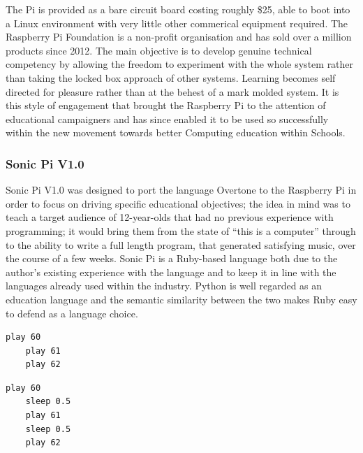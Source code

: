 \documentclass[11pt, abstracton, twoside]{scrartcl}
\begin{document}
The Pi is provided as a bare circuit board costing roughly \$25, able to boot 
into a Linux environment with very little other commerical equipment required. 
The Raspberry Pi Foundation is a non-profit organisation and has sold over a 
million products since 2012. The main objective is to develop genuine 
technical competency by allowing the freedom to experiment with the whole 
system rather than taking the locked box approach of other systems. Learning 
becomes self directed for pleasure rather than at the behest of a mark molded 
system. It is this style of engagement that brought the Raspberry Pi to the 
attention of educational campaigners and has since enabled it to be used so 
successfully within the new movement towards better Computing education within 
Schools. 

\subsubsection{Sonic Pi V1.0}

\begin{multicols}{2}
Sonic Pi V1.0 was designed to port the language Overtone to the Raspberry Pi in 
order to focus on driving specific educational objectives; the idea in mind was 
to teach a target audience of 12-year-olds that had no previous experience with 
programming; it would bring them from the state of ``this is a computer'' through 
to the ability to write a full length program, that generated satisfying music, 
over the course of a few weeks. Sonic Pi is a Ruby-based language both due to 
the author's existing experience with the language and to keep it in line with 
the languages already used within the industry. Python is well regarded as an 
education language and the semantic similarity between the two makes Ruby easy 
to defend as a language choice.
\\

\begin{minipage}{0.5\textwidth}
	\begin{minipage}[t]{\textwidth}
		\begin{lstlisting}[style = sonicpi]
	play 60
	play 61
	play 62
		\end{lstlisting}
	\end{minipage}

	\begin{minipage}[t]{\textwidth}
		\begin{lstlisting}[style = sonicpi]
	play 60
	sleep 0.5
	play 61
	sleep 0.5
	play 62
		\end{lstlisting}
	\end{minipage}
\end{minipage}

\end{multicols}
\end{document}
